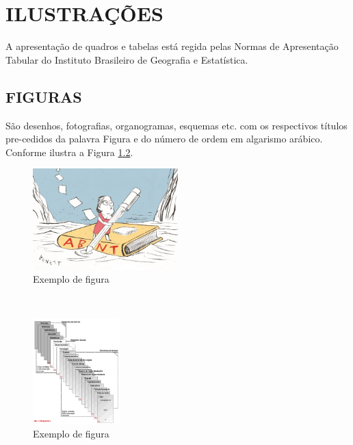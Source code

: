 %
%
\chapter{ILUSTRAÇÕES}


A apresentação de quadros e tabelas está regida pelas Normas de Apresentação Tabular do Instituto Brasileiro de Geografia e Estatística.

\section{FIGURAS}

São desenhos, fotografias, organogramas, esquemas etc. com os respectivos títulos pre-cedidos da palavra Figura e do número de ordem em algarismo arábico. Conforme ilustra a Figura \ref{fig:abnt}.

\begin{figure}[H]
    \centering
    
	\vspace*{0,2cm}
    \includegraphics[width=0.5\textwidth]{./04-figuras/navegar_abnt}
    \caption{Exemplo de figura}
    \label{fig:ilustfig}
\end{figure}
\vspace*{-1,5cm}
{\raggedright {}}\\


\begin{figure}[H]
    \centering
    
	\vspace*{0,2cm}
    \includegraphics[width=0.3\textwidth]{./04-figuras/abnt.png}
    \caption{Exemplo de figura}
    \label{fig:abnt}
\end{figure}
\vspace*{-1,5cm}
{\raggedright {}}
\newpage

